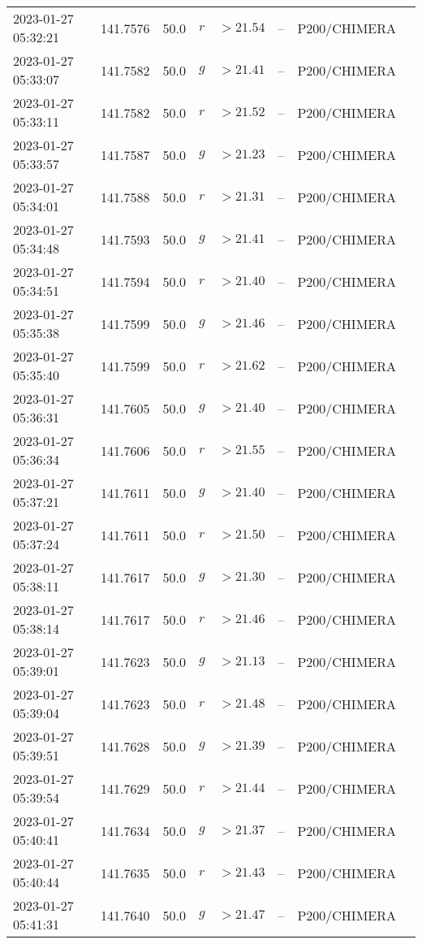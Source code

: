\documentclass{nature_plusfigure}
\begin{document}
\begin{supplement}
\begin{center}
\begin{longtable}{llllllll}
2023-01-27 05:32:21 & 141.7576 & 50.0 & $r$ & $>21.54$ & -- & P200/CHIMERA &  \\ 
2023-01-27 05:33:07 & 141.7582 & 50.0 & $g$ & $>21.41$ & -- & P200/CHIMERA &  \\ 
2023-01-27 05:33:11 & 141.7582 & 50.0 & $r$ & $>21.52$ & -- & P200/CHIMERA &  \\ 
2023-01-27 05:33:57 & 141.7587 & 50.0 & $g$ & $>21.23$ & -- & P200/CHIMERA &  \\ 
2023-01-27 05:34:01 & 141.7588 & 50.0 & $r$ & $>21.31$ & -- & P200/CHIMERA &  \\ 
2023-01-27 05:34:48 & 141.7593 & 50.0 & $g$ & $>21.41$ & -- & P200/CHIMERA &  \\ 
2023-01-27 05:34:51 & 141.7594 & 50.0 & $r$ & $>21.40$ & -- & P200/CHIMERA &  \\ 
2023-01-27 05:35:38 & 141.7599 & 50.0 & $g$ & $>21.46$ & -- & P200/CHIMERA &  \\ 
2023-01-27 05:35:40 & 141.7599 & 50.0 & $r$ & $>21.62$ & -- & P200/CHIMERA &  \\ 
2023-01-27 05:36:31 & 141.7605 & 50.0 & $g$ & $>21.40$ & -- & P200/CHIMERA &  \\ 
2023-01-27 05:36:34 & 141.7606 & 50.0 & $r$ & $>21.55$ & -- & P200/CHIMERA &  \\ 
2023-01-27 05:37:21 & 141.7611 & 50.0 & $g$ & $>21.40$ & -- & P200/CHIMERA &  \\ 
2023-01-27 05:37:24 & 141.7611 & 50.0 & $r$ & $>21.50$ & -- & P200/CHIMERA &  \\ 
2023-01-27 05:38:11 & 141.7617 & 50.0 & $g$ & $>21.30$ & -- & P200/CHIMERA &  \\ 
2023-01-27 05:38:14 & 141.7617 & 50.0 & $r$ & $>21.46$ & -- & P200/CHIMERA &  \\ 
2023-01-27 05:39:01 & 141.7623 & 50.0 & $g$ & $>21.13$ & -- & P200/CHIMERA &  \\ 
2023-01-27 05:39:04 & 141.7623 & 50.0 & $r$ & $>21.48$ & -- & P200/CHIMERA &  \\ 
2023-01-27 05:39:51 & 141.7628 & 50.0 & $g$ & $>21.39$ & -- & P200/CHIMERA &  \\ 
2023-01-27 05:39:54 & 141.7629 & 50.0 & $r$ & $>21.44$ & -- & P200/CHIMERA &  \\ 
2023-01-27 05:40:41 & 141.7634 & 50.0 & $g$ & $>21.37$ & -- & P200/CHIMERA &  \\ 
2023-01-27 05:40:44 & 141.7635 & 50.0 & $r$ & $>21.43$ & -- & P200/CHIMERA &  \\ 
2023-01-27 05:41:31 & 141.7640 & 50.0 & $g$ & $>21.47$ & -- & P200/CHIMERA &  \\ 

\end{longtable}
\end{center}
\end{supplement}
\end{document}
